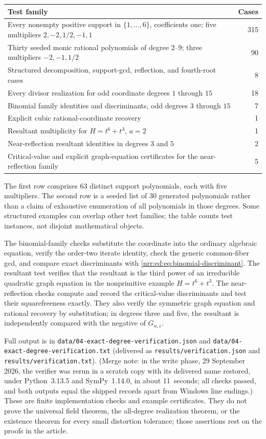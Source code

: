 \documentclass[11pt,letterpaper]{article}
\theoremstyle{definition}
\theoremstyle{remark}
\newcommand{\eps}{\varepsilon}
\begin{document}
\begin{center}
\small
\begin{tabularx}{\textwidth}{@{}Xr@{}}
\toprule
Test family & Cases \\
\midrule
Every nonempty positive support in $\{1,\ldots,6\}$, coefficients one;
 five multipliers $2,-2,1/2,-1,1$ & 315 \\
Thirty seeded monic rational polynomials of degree $2$--$9$;
 three multipliers $-2,-1,1/2$ & 90 \\
Structured decomposition, support-gcd, reflection, and fourth-root cases & 8 \\
Every divisor realization for odd coordinate degrees $1$ through $15$ & 18 \\
Binomial family identities and discriminants, odd degrees $3$ through $15$ & 7 \\
Explicit cubic rational-coordinate recovery & 1 \\
Resultant multiplicity for $H=t^6+t^3$, $a=2$ & 1 \\
Near-reflection resultant identities in degrees $3$ and $5$ & 2 \\
Critical-value and explicit graph-equation certificates for the near-reflection family & 5 \\
\bottomrule
\end{tabularx}
\end{center}

The first row comprises 63 distinct support polynomials, each with five
multipliers. The second row is a seeded list of 30 generated polynomials rather
than a claim of exhaustive enumeration of all polynomials in those degrees.
Some structured examples can overlap other test families; the table counts test
instances, not disjoint mathematical objects.

The binomial-family checks substitute the coordinate into the ordinary algebraic
equation, verify the order-two iterate identity, check the generic common-fiber
gcd, and compare exact discriminants with \eqref{nrr:ed:eq:binomial-discriminant}.
The resultant test verifies that the resultant is the third power of an
irreducible quadratic graph equation in the nonprimitive example $H=t^6+t^3$.
The near-reflection checks compute and record the critical-value discriminants
and test their squarefreeness exactly. They also verify the symmetric graph equation
and rational recovery by substitution; in degrees three and five, the resultant
is independently compared with the negative of $G_{n,\eps}$.

Full output is in \nolinkurl{data/04-exact-degree-verification.json} and
\nolinkurl{data/04-exact-degree-verification.txt} (delivered as
\texttt{results/verification.json} and \texttt{results/verification.txt}).
(Merge note: in the write phase, 29 September 2026, the verifier was rerun in a
scratch copy with its delivered name restored, under Python~3.13.5 and
SymPy~1.14.0, in about 11~seconds; all checks passed, and both outputs equal
the shipped records apart from Windows line endings.) These are finite implementation checks and
example certificates. They do not prove the universal field theorem, the
all-degree realization theorem, or the existence theorem for every small
distortion tolerance; those assertions rest on the proofs in the article.
\end{document}
